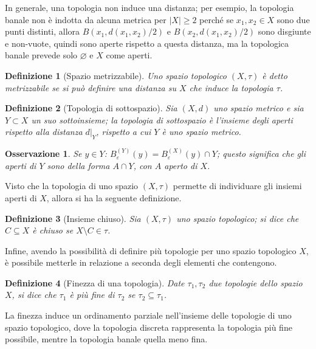 \documentclass[12pt]{scrartcl}
\theoremstyle{style}
\newtheorem{definizione}{Definizione}[section]
\newtheorem{osservazione}{Osservazione}[section]
\numberwithin{equation}{subsection}
\begin{document}
\noindent In generale, una topologia non induce una distanza; per esempio, la topologia banale non \`e indotta da alcuna metrica per $\lvert X \rvert \ge 2$ perch\'e se $x_1,x_2\in X$ sono due punti distinti, allora $B(x_1,d(x_1,x_2) /2 ) $ e $B(x_2,d(x_1,x_2)/2)$ sono disgiunte e non-vuote, quindi sono aperte rispetto a questa distanza, ma la topologica banale prevede solo $\varnothing$ e $X$ come aperti.
\begin{definizione}
	[Spazio metrizzabile]
	Uno spazio topologico $(X,\tau )$ \`e detto \textit{metrizzabile} se si pu\`o definire una distanza su $X$ che induce la topologia $\tau $.
\end{definizione}
\begin{definizione}
	[Topologia di sottospazio]
	Sia $(X,d)$ uno spazio metrico e sia $Y \subset X$ un suo sottoinsieme; la topologia di sottospazio \`e l'insieme degli aperti rispetto alla distanza $d|_Y$, rispetto a cui $Y$ \`e uno spazio metrico.
\end{definizione}
\begin{osservazione}
Se $y \in Y$: $B_\varepsilon ^{(Y)} (y) = B_\varepsilon ^{(X)} (y) \cap Y$; questo significa che gli aperti di $Y$ sono della forma $A \cap Y$, con $A $ aperto di $X$.
\end{osservazione}
\noindent Visto che la topologia di uno spazio $(X,\tau )$ permette di individuare gli insiemi aperti di $X$, allora si ha la seguente definizione.
\begin{definizione}
	[Insieme chiuso]
	Sia $(X,\tau )$ uno spazio topologico; si dice che $C \subseteq X$ \`e chiuso se $X \setminus C \in \tau $.
\end{definizione}
\noindent Infine, avendo la possibilit\`a di definire pi\`u topologie per uno spazio topologico $X$, \`e possibile metterle in relazione a seconda degli elementi che contengono.
\begin{definizione}
	[Finezza di una topologia]
	Date $\tau _1, \tau _2$ due topologie dello spazio $X$, si dice che $\tau _1$ \`e pi\`u fine di $\tau _2$ se $\tau _2 \subseteq \tau _1$.
\end{definizione}
\noindent La finezza induce un ordinamento parziale nell'insieme delle topologie di uno spazio topologico, dove la topologia discreta rappresenta la topologia pi\`u fine possibile, mentre la topologia banale quella meno fina.
\end{document}
